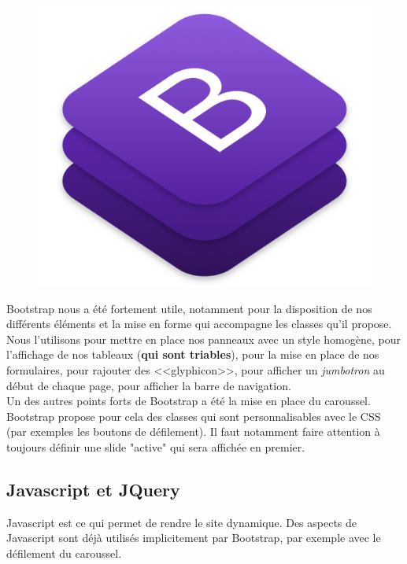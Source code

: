 \documentclass[titlepage,11pt,a4paper]{article}
\begin{document}
\begin{figure}
\includegraphics[scale=0.12]{bootstrap.png}
\end{figure}
Bootstrap nous a été fortement utile, notamment pour la disposition de nos différents éléments et la mise en forme qui accompagne les classes qu'il propose. Nous l'utilisons pour mettre en place nos panneaux avec un style homogène, pour l'affichage de nos tableaux (\textbf{qui sont triables}), pour la mise en place de nos formulaires, pour rajouter des <<glyphicon>>, pour afficher un \emph{jumbotron} au début de chaque page, pour afficher la barre de navigation.\\

Un des autres points forts de Bootstrap a été la mise en place du caroussel. Bootstrap propose pour cela des classes qui sont personnalisables avec le CSS (par exemples les boutons de défilement). Il faut notamment faire attention à toujours définir une slide "active" qui sera affichée en premier.\\


\subsection{Javascript et JQuery}

Javascript est ce qui permet de rendre le site dynamique. Des aspects de Javascript sont déjà utilisés implicitement par Bootstrap, par exemple avec le défilement du caroussel.\\
\end{document}
